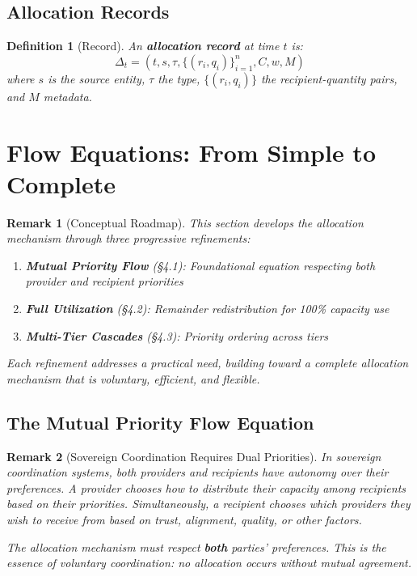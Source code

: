 \documentclass[11pt]{article}
\newtheorem{definition}{Definition}
\newtheorem{remark}{Remark}
\begin{document}
\subsection{Allocation Records}

\begin{definition}[Record]
An \textbf{allocation record} at time $t$ is:
\[
\Delta_t = (t, s, \tau, \{(r_i, q_i)\}_{i=1}^n, C, w, M)
\]
where $s$ is the source entity, $\tau$ the type, $\{(r_i, q_i)\}$ the recipient-quantity pairs, and $M$ metadata.
\end{definition}

\section{Flow Equations: From Simple to Complete}

\begin{remark}[Conceptual Roadmap]
This section develops the allocation mechanism through three progressive refinements:

\begin{enumerate}
\item \textbf{Mutual Priority Flow} (§4.1): Foundational equation respecting both provider and recipient priorities
\item \textbf{Full Utilization} (§4.2): Remainder redistribution for 100\% capacity use
\item \textbf{Multi-Tier Cascades} (§4.3): Priority ordering across tiers
\end{enumerate}

Each refinement addresses a practical need, building toward a complete allocation mechanism that is voluntary, efficient, and flexible.
\end{remark}

\subsection{The Mutual Priority Flow Equation}

\begin{remark}[Sovereign Coordination Requires Dual Priorities]
In sovereign coordination systems, both providers and recipients have autonomy over their preferences. A provider chooses how to distribute their capacity among recipients based on their priorities. Simultaneously, a recipient chooses which providers they wish to receive from based on trust, alignment, quality, or other factors. 

The allocation mechanism must respect \textbf{both} parties' preferences. This is the essence of voluntary coordination: no allocation occurs without mutual agreement.
\end{remark}
\end{document}
